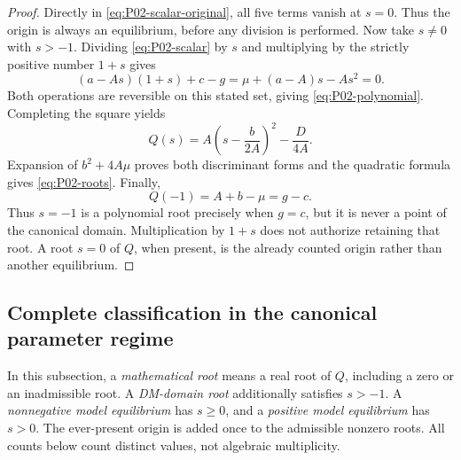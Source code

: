 \begin{proof}
Directly in \eqref{eq:P02-scalar-original}, all five terms vanish
at $s=0$. Thus the origin is always an equilibrium, before any
division is performed. Now take $s\ne0$ with $s>-1$.
Dividing \eqref{eq:P02-scalar} by $s$ and multiplying by
the strictly positive number $1+s$ gives
\[
 (a-As)(1+s)+c-g=\mu+(a-A)s-As^2=0.
\]
Both operations are reversible on this stated set, giving
\eqref{eq:P02-polynomial}. Completing the square yields
\begin{equation}
\label{eq:P02-square}
 Q(s)=A\left(s-\frac b{2A}\right)^2-\frac D{4A}.
\end{equation}
Expansion of $b^2+4A\mu$ proves both discriminant forms and the
quadratic formula gives \eqref{eq:P02-roots}. Finally,
\begin{equation}
\label{eq:P02-minusone}
 Q(-1)=A+b-\mu=g-c.
\end{equation}
Thus $s=-1$ is a polynomial root precisely when $g=c$, but it is
never a point of the canonical domain. Multiplication by $1+s$
does not authorize retaining that root. A root $s=0$ of $Q$, when
present, is the already counted origin rather than another equilibrium.
\end{proof}

\subsection{Complete classification in the canonical parameter regime}
\label{slot:P02-3}

In this subsection, a \emph{mathematical root} means a real root of
$Q$, including a zero or an inadmissible root. A \emph{DM-domain root}
additionally satisfies $s>-1$. A \emph{nonnegative model equilibrium}
has $s\ge0$, and a \emph{positive model equilibrium} has $s>0$.
The ever-present origin is added once to the admissible nonzero roots.
All counts below count distinct values, not algebraic multiplicity.

